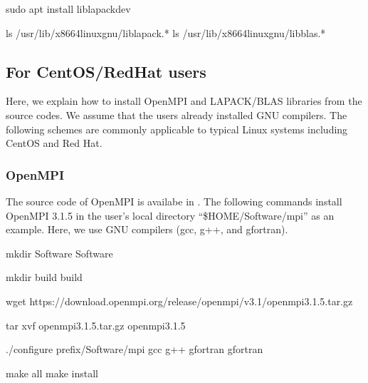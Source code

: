 \documentclass[a4paper,11pt,oneside,english]{sphinxmanual}
\begin{document}
\begin{sphinxVerbatim}[commandchars=\\\{\}]
\PYGZdl{} sudo apt install liblapack\PYGZhy{}dev

\PYGZdl{} ls /usr/lib/x86\PYGZus{}64\PYGZhy{}linux\PYGZhy{}gnu/liblapack.*
\PYGZdl{} ls /usr/lib/x86\PYGZus{}64\PYGZhy{}linux\PYGZhy{}gnu/libblas.*
\end{sphinxVerbatim}

\clearpage


\subsection{For CentOS/RedHat users}
\label{\detokenize{98_Appendix:for-centos-redhat-users}}
Here, we explain how to install OpenMPI and LAPACK/BLAS libraries from the source codes.
We assume that the users already installed GNU compilers.
The following schemes are commonly applicable to typical Linux systems including CentOS and Red Hat.


\subsubsection{OpenMPI}
\label{\detokenize{98_Appendix:id2}}
The source code of OpenMPI is availabe in .
The following commands install OpenMPI 3.1.5 in the user’s local directory
“\$HOME/Software/mpi” as an example.
Here, we use GNU compilers (gcc, g++, and gfortran).

\begin{sphinxVerbatim}[commandchars=\\\{\}]
\PYGZdl{}  
\PYGZdl{} mkdir Software
\PYGZdl{}  Software

\PYGZdl{} mkdir build
\PYGZdl{}  build

\PYGZdl{} wget https://download.open\PYGZhy{}mpi.org/release/open\PYGZhy{}mpi/v3.1/openmpi\PYGZhy{}3.1.5.tar.gz

\PYGZdl{} tar \PYGZhy{}xvf openmpi\PYGZhy{}3.1.5.tar.gz
\PYGZdl{}  openmpi\PYGZhy{}3.1.5

\PYGZdl{} ./configure \PYGZhy{}\PYGZhy{}prefix/Software/mpi gcc g++ gfortran gfortran

\PYGZdl{} make all
\PYGZdl{} make install
\end{sphinxVerbatim}
\end{document}
